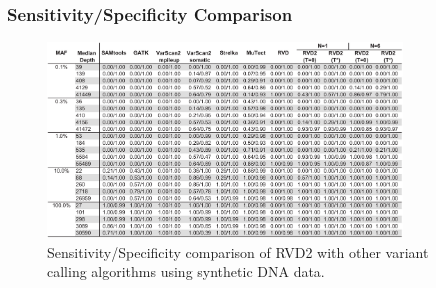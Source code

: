 \documentclass{bioinfo}
\begin{document}

\subsubsection*{Sensitivity/Specificity Comparison}

\begin{figure}[!htpb]
\centering
\vspace{-10pt}
\includegraphics[width=0.84\textwidth]{pdf_figs/comparison_table_ss.pdf}
\caption{Sensitivity/Specificity comparison of RVD2 with other variant calling algorithms using synthetic DNA data.}
\vspace{-10pt}
\label{tbl:comparison_ss}
\end{figure}
\end{document}

